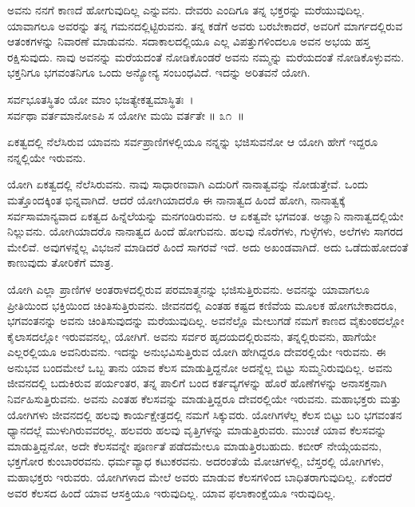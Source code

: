 ಅವನು ನನಗೆ ಕಾಣದೆ ಹೋಗುವುದಿಲ್ಲ ಎನ್ನುವನು. ದೇವರು ಎಂದಿಗೂ ತನ್ನ ಭಕ್ತರನ್ನು ಮರೆಯುವುದಿಲ್ಲ. ಯಾವಾಗಲೂ ಅವರನ್ನು ತನ್ನ ಗಮನದಲ್ಲಿಟ್ಟಿರುವನು. ತನ್ನ ಕಡೆಗೆ ಅವರು ಬರಬೇಕಾದರೆ, ಅವರಿಗೆ ಮಾರ್ಗದಲ್ಲಿರುವ ಆತಂಕಗಳನ್ನು ನಿವಾರಣೆ ಮಾಡುವನು. ಸದಾಕಾಲದಲ್ಲಿಯೂ ಎಲ್ಲ ವಿಪತ್ತುಗಳಿಂದಲೂ ಅವನ ಅಭಯ ಹಸ್ತ ರಕ್ಷಿಸುವುದು. ನಾವು ಅವನನ್ನು ಮರೆಯದಂತೆ ನೋಡಿಕೊಂಡರೆ ಅವನು ನಮ್ಮನ್ನು ಮರೆಯದಂತೆ ನೋಡಿಕೊಳ್ಳುವನು. ಭಕ್ತನಿಗೂ ಭಗವಂತನಿಗೂ ಒಂದು ಅನ್ಯೋನ್ಯ ಸಂಬಂಧವಿದೆ. ಇದನ್ನು ಅರಿತವನೆ ಯೋಗಿ.

\begin{shloka}
ಸರ್ವಭೂತಸ್ಥಿತಂ ಯೋ ಮಾಂ ಭಜತ್ಯೇಕತ್ವಮಾಸ್ಥಿತಃ~।\\ಸರ್ವಥಾ ವರ್ತಮಾನೋಽಪಿ ಸ ಯೋಗೀ ಮಯಿ ವರ್ತತೇ \hfill॥ ೩೧~॥
\end{shloka}

\begin{artha}
ಏಕತ್ವದಲ್ಲಿ ನೆಲೆಸಿರುವ ಯಾವನು ಸರ್ವಪ್ರಾಣಿಗಳಲ್ಲಿಯೂ ನನ್ನನ್ನು ಭಜಿಸುವನೋ ಆ ಯೋಗಿ ಹೇಗೆ ಇದ್ದರೂ ನನ್ನಲ್ಲಿಯೇ ಇರುವನು.
\end{artha}

ಯೋಗಿ ಏಕತ್ವದಲ್ಲಿ ನೆಲೆಸಿರುವನು. ನಾವು ಸಾಧಾರಣವಾಗಿ ಎದುರಿಗೆ ನಾನಾತ್ವವನ್ನು ನೋಡುತ್ತೇವೆ. ಒಂದು ಮತ್ತೊಂದಕ್ಕಿಂತ ಭಿನ್ನವಾಗಿದೆ. ಆದರೆ ಯೋಗಿಯಾದರೊ ಈ ನಾನಾತ್ವದ ಹಿಂದೆ ಹೋಗಿ, ನಾನಾತ್ವಕ್ಕೆ ಸರ್ವಸಾಮಾನ್ಯವಾದ ಏಕತ್ವದ ಹಿನ್ನೆಲೆಯನ್ನು ಮನಗಂಡಿರುವನು. ಆ ಏಕತ್ವವೇ ಭಗವಂತ. ಅಜ್ಞಾನಿ ನಾನಾತ್ವದಲ್ಲಿಯೇ ನಿಲ್ಲುವನು. ಯೋಗಿಯಾದರೊ ನಾನಾತ್ವದ ಹಿಂದೆ ಹೋಗುವನು. ಹಲವು ನೊರೆಗಳು, ಗುಳ್ಳೆಗಳು, ಅಲೆಗಳು ಸಾಗರದ ಮೇಲಿವೆ. ಅವುಗಳನ್ನೆಲ್ಲ ವಿಭಜನೆ ಮಾಡಿದರೆ ಹಿಂದೆ ಸಾಗರವೆ ಇದೆ. ಅದು ಅಖಂಡವಾಗಿದೆ. ಅದು ಒಡೆದುಹೋದಂತೆ ಕಾಣುವುದು ತೋರಿಕೆಗೆ ಮಾತ್ರ.

ಯೋಗಿ ಎಲ್ಲಾ ಪ್ರಾಣಿಗಳ ಅಂತರಾಳದಲ್ಲಿರುವ ಪರಮಾತ್ಮನನ್ನು ಭಜಿಸುತ್ತಿರುವನು. ಅವನನ್ನು ಯಾವಾಗಲೂ ಪ್ರೀತಿಯಿಂದ ಭಕ್ತಿಯಿಂದ ಚಿಂತಿಸುತ್ತಿರುವನು. ಜೀವನದಲ್ಲಿ ಎಂತಹ ಕಷ್ಟದ ಕಣಿವೆಯ ಮೂಲಕ ಹೋಗಬೇಕಾದರೂ, ಭಗವಂತನನ್ನು ಅವನು ಚಿಂತಿಸುವುದನ್ನು ಮರೆಯುವುದಿಲ್ಲ. ಅವನೆಲ್ಲೊ ಮೇಲುಗಡೆ ನಮಗೆ ಕಾಣದ ವೈಕುಂಠದಲ್ಲೋ ಕೈಲಾಸದಲ್ಲೋ ಇರುವವನಲ್ಲ, ಯೋಗಿಗೆ. ಅವನು ಸರ್ವರ ಹೃದಯದಲ್ಲಿರುವನು, ತನ್ನಲ್ಲಿರುವನು, ಹಾಗೆಯೇ ಎಲ್ಲರಲ್ಲಿಯೂ ಅವನಿರುವನು. ಇದನ್ನು ಅನುಭವಿಸುತ್ತಿರುವ ಯೋಗಿ ಹೇಗಿದ್ದರೂ ದೇವರಲ್ಲಿಯೇ ಇರುವನು. ಈ ಅನುಭವ ಬಂದಮೇಲೆ ಒಬ್ಬ ತಾನು ಯಾವ ಕೆಲಸ ಮಾಡುತ್ತಿದ್ದನೋ ಅದನ್ನೆಲ್ಲ ಬಿಟ್ಟು ಸುಮ್ಮನಿರುವುದಿಲ್ಲ. ಅವನು ಜೀವನದಲ್ಲಿ ಬದುಕಿರುವ ಪರ್ಯಂತರ, ತನ್ನ ಪಾಲಿಗೆ ಬಂದ ಕರ್ತವ್ಯಗಳನ್ನು ಹೊರೆ ಹೊಣೆಗಳನ್ನು ಅನಾಸಕ್ತನಾಗಿ ನಿರ್ವಹಿಸುತ್ತಿರುವನು. ಅವನು ಎಂತಹ ಕೆಲಸವನ್ನು ಮಾಡುತ್ತಿದ್ದರೂ ದೇವರಲ್ಲಿಯೇ ಇರುವನು. ಮಹಾಭಕ್ತರು ಮತ್ತು ಯೋಗಿಗಳು ಜೀವನದಲ್ಲಿ ಹಲವು ಕಾರ್ಯಕ್ಷೇತ್ರದಲ್ಲಿ ನಮಗೆ ಸಿಕ್ಕುವರು. ಯೋಗಿಗಳೆಲ್ಲ ಕೆಲಸ ಬಿಟ್ಟು ಬರಿ ಭಗವಂತನ ಧ್ಯಾನದಲ್ಲೆ ಮುಳುಗಿರುವವರಲ್ಲ. ಹಲವರು ಹಲವು ವೃತ್ತಿಗಳನ್ನು ಮಾಡುತ್ತಿರುವರು. ಮುಂಚೆ ಯಾವ ಕೆಲಸವನ್ನು ಮಾಡುತ್ತಿದ್ದನೋ, ಅದೇ ಕೆಲಸವನ್ನೇ ಪೂರ್ಣತೆ ಪಡೆದಮೇಲೂ ಮಾಡುತ್ತಿರಬಹುದು. ಕಬೀರ್ ನೇಯ್ಗೆಯವನು, ಭಕ್ತಗೋರ ಕುಂಬಾರರವನು. ಧರ್ಮವ್ಯಾಧ ಕಟುಕರವನು. ಅದರಂತೆಯೆ ಮೋಚಿಗಳಲ್ಲಿ, ಬೆಸ್ತರಲ್ಲಿ ಯೋಗಿಗಳು, ಮಹಾಭಕ್ತರು ಇರುವರು. ಯೋಗಿಗಳಾದ ಮೇಲೆ ಅವರು ಮಾಡುವ ಕೆಲಸಗಳಿಂದ ಬಾಧಿತರಾಗುವುದಿಲ್ಲ. ಏಕೆಂದರೆ ಅವರ ಕೆಲಸದ ಹಿಂದೆ ಯಾವ ಆಸಕ್ತಿಯೂ ಇರುವುದಿಲ್ಲ. ಯಾವ ಫಲಾಕಾಂಕ್ಷೆಯೂ ಇರುವುದಿಲ್ಲ.

